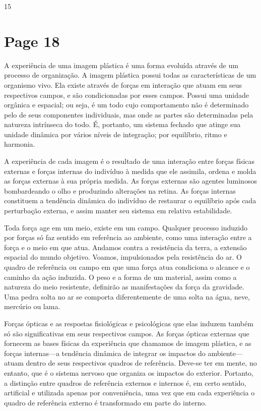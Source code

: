 \documentclass[a4paper]{article}
\begin{document}
\vfill
\null\hfill 15

\newpage
\section*{Page 18}

A experiência de uma imagem plástica é uma forma evoluída através de um processo de organização. A imagem plástica possui todas as características de um organismo vivo. Ela existe através de forças em interação que atuam em seus respectivos campos, e são condicionadas por esses campos. Possui uma unidade orgânica e espacial; ou seja, é um todo cujo comportamento não é determinado pelo de seus componentes individuais, mas onde as partes são determinadas pela natureza intrínseca do todo. É, portanto, um sistema fechado que atinge sua unidade dinâmica por vários níveis de integração; por equilíbrio, ritmo e harmonia.

A experiência de cada imagem é o resultado de uma interação entre forças físicas externas e forças internas do indivíduo à medida que ele assimila, ordena e molda as forças externas à sua própria medida. As forças externas são agentes luminosos bombardeando o olho e produzindo alterações na retina. As forças internas constituem a tendência dinâmica do indivíduo de restaurar o equilíbrio após cada perturbação externa, e assim manter seu sistema em relativa estabilidade.

Toda força age em um meio, existe em um campo. Qualquer processo induzido por forças só faz sentido em referência ao ambiente, como uma interação entre a força e o meio em que atua. Andamos contra a resistência da terra, a extensão espacial do mundo objetivo. Voamos, impulsionados pela resistência do ar. O quadro de referência ou campo em que uma força atua condiciona o alcance e o caminho da ação induzida. O peso e a forma de um material, assim como a natureza do meio resistente, definirão as manifestações da força da gravidade. Uma pedra solta no ar se comporta diferentemente de uma solta na água, neve, mercúrio ou lama.

Forças ópticas e as respostas fisiológicas e psicológicas que elas induzem também só são significativas em seus respectivos campos. As forças ópticas externas que fornecem as bases físicas da experiência que chamamos de imagem plástica, e as forças internas---a tendência dinâmica de integrar os impactos do ambiente---atuam dentro de seus respectivos quadros de referência. Deve-se ter em mente, no entanto, que é o sistema nervoso que organiza os impactos do exterior. Portanto, a distinção entre quadros de referência externos e internos é, em certo sentido, artificial e utilizada apenas por conveniência, uma vez que em cada experiência o quadro de referência externo é transformado em parte do interno.
\end{document}
